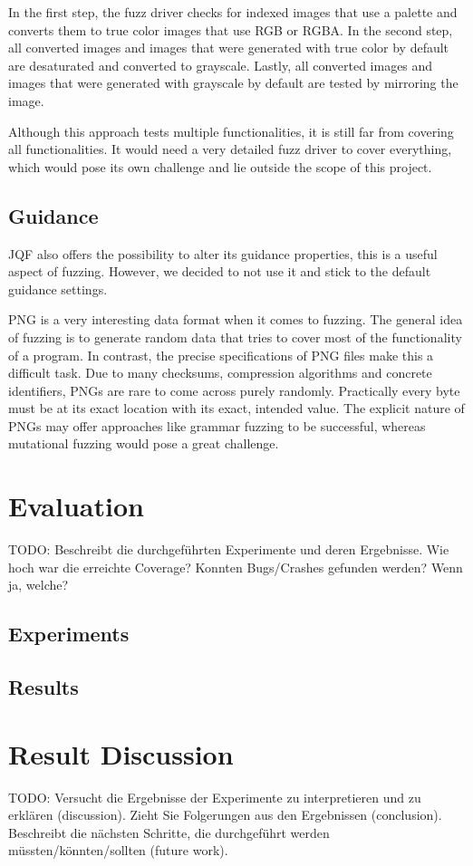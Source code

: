 \documentclass[runningheads]{llncs}
\begin{document}
In the first step, the fuzz driver checks for indexed images that use a palette and converts them to true color images that use RGB or RGBA. 
In the second step, all converted images and images that were generated with true color by default are desaturated and converted to grayscale.
Lastly, all converted images and images that were generated with grayscale by default are tested by mirroring the image.

Although this approach tests multiple functionalities, it is still far from covering all functionalities.
It would need a very detailed fuzz driver to cover everything, which would pose its own challenge and lie outside the scope of this project.

\subsection{Guidance}
JQF also offers the possibility to alter its guidance properties, this is a useful aspect of fuzzing. However, we decided to not use it and stick to the default guidance settings.

PNG is a very interesting data format when it comes to fuzzing. The general idea of fuzzing is to generate random data that tries to cover most of the functionality of a program.
In contrast, the precise specifications of PNG files make this a difficult task. 
Due to many checksums, compression algorithms and concrete identifiers, PNGs are rare to come across purely randomly.
Practically every byte must be at its exact location with its exact, intended value.
The explicit nature of PNGs may offer approaches like grammar fuzzing to be successful, whereas mutational fuzzing would pose a great challenge.

\section{Evaluation}
TODO: Beschreibt die durchgeführten Experimente und deren Ergebnisse. Wie hoch war die erreichte Coverage? Konnten Bugs/Crashes gefunden werden? Wenn ja, welche?
\subsection{Experiments}
\subsection{Results}

\section{Result Discussion}
TODO: Versucht die Ergebnisse der Experimente zu interpretieren und zu erklären (discussion). Zieht Sie Folgerungen aus den Ergebnissen (conclusion). Beschreibt die nächsten Schritte, die durchgeführt werden müssten/könnten/sollten (future work).
\end{document}
